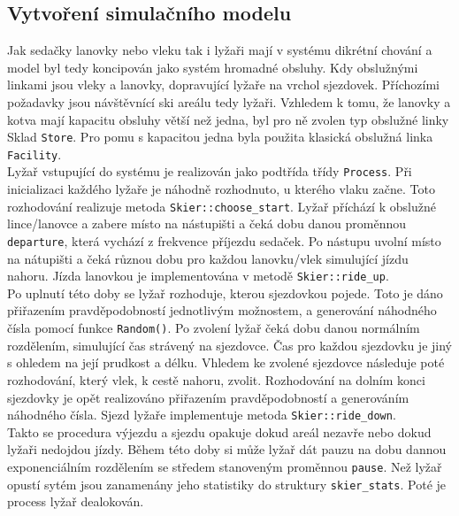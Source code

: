 \documentclass[a4paper, 11pt]{article}\usepackage{times}
\begin{document}
\subsection{Vytvoření simulačního modelu}
 Jak sedačky lanovky nebo vleku tak i lyžaři mají v systému dikrétní chování a model byl tedy koncipován jako systém hromadné obsluhy. Kdy obslužnými linkami jsou vleky a lanovky, dopravující lyžaře na vrchol sjezdovek. Příchozími požadavky jsou návštěvnící ski areálu tedy lyžaři. Vzhledem k tomu, že lanovky a kotva mají kapacitu obsluhy větší než jedna, byl pro ně zvolen typ obslužné linky Sklad \texttt{Store}. Pro pomu s kapacitou jedna byla použita klasická obslužná linka \texttt{Facility}.
 \\

 Lyžař vstupující do systému je realizován jako podtřída třídy \texttt{Process}.
 Při inicializaci každého lyžaře je náhodně rozhodnuto, u kterého vlaku začne.
 Toto rozhodování realizuje metoda \texttt{Skier::choose\_start}.
 Lyžař příchází k obslužné lince/lanovce a zabere místo na nástupišti a čeká dobu danou proměnnou \texttt{departure}, která vychází z frekvence příjezdu sedaček. Po nástupu uvolní místo na nátupišti a čeká různou dobu pro každou lanovku/vlek simulující jízdu nahoru. Jízda lanovkou je implementována v metodě \texttt{Skier::ride\_up}.\\

 Po uplnutí této doby se lyžař rozhoduje, kterou sjezdovkou pojede. Toto je dáno přiřazením pravděpodobností jednotlivým možnostem, a generování náhodného čísla pomocí funkce \texttt{Random()}. Po zvolení lyžař čeká dobu danou normálním rozdělením, simulující čas strávený na sjezdovce. Čas pro každou sjezdovku je jiný s ohledem na její prudkost a délku. Vhledem ke zvolené sjezdovce následuje poté rozhodování, který vlek, k cestě nahoru, zvolit. Rozhodování na dolním konci sjezdovky je opět realizováno přiřazením pravděpodobností a generováním náhodného čísla. Sjezd lyžaře implementuje metoda \texttt{Skier::ride\_down}. \\
 Takto se procedura výjezdu a sjezdu opakuje dokud areál nezavře nebo dokud lyžaři nedojdou jízdy. Během této doby si může lyžař dát pauzu na dobu dannou exponenciálním rozdělením se středem stanoveným proměnnou \texttt{pause}. Než lyžař opustí sytém jsou zanamenány jeho statistiky do struktury \texttt{skier\_stats}. Poté je process lyžař dealokován. \\
\end{document}
